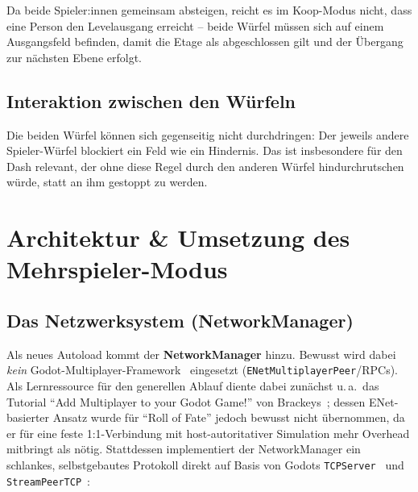\documentclass[oneside]{ausarbeitung}
\begin{document}
Da beide Spieler:innen gemeinsam absteigen, reicht es im Koop-Modus nicht, dass eine Person den
Levelausgang erreicht -- beide Würfel müssen sich auf einem Ausgangsfeld befinden, damit die Etage
als abgeschlossen gilt und der Übergang zur nächsten Ebene erfolgt.

\section{Interaktion zwischen den Würfeln}

Die beiden Würfel können sich gegenseitig nicht durchdringen: Der jeweils andere Spieler-Würfel
blockiert ein Feld wie ein Hindernis. Das ist insbesondere für den Dash relevant, der ohne diese
Regel durch den anderen Würfel hindurchrutschen würde, statt an ihm gestoppt zu werden.


\chapter{Architektur \& Umsetzung des Mehrspieler-Modus}
\label{cha:coop-architektur}

\section{Das Netzwerksystem (NetworkManager)}

Als neues Autoload kommt der \textbf{NetworkManager} hinzu. Bewusst wird dabei \textit{kein}
Godot-Multiplayer-Framework~\cite{godot:multiplayerdocs} eingesetzt (\texttt{ENetMultiplayerPeer}/RPCs).
Als Lernressource für den generellen Ablauf diente dabei zunächst u.\,a.\ das Tutorial \enquote{Add
Multiplayer to your Godot Game!} von Brackeys~\cite{brackeys:multiplayer}; dessen ENet-basierter Ansatz
wurde für \enquote{Roll of Fate} jedoch bewusst nicht übernommen, da er für eine feste 1:1-Verbindung
mit host-autoritativer Simulation mehr Overhead mitbringt als nötig. Stattdessen implementiert der
NetworkManager ein schlankes, selbstgebautes Protokoll direkt auf Basis von Godots
\texttt{TCPServer}~\cite{godot:tcpserver} und \texttt{StreamPeerTCP}~\cite{godot:streampeertcp}:

\begin{infoblock}
\end{infoblock}
\end{document}
